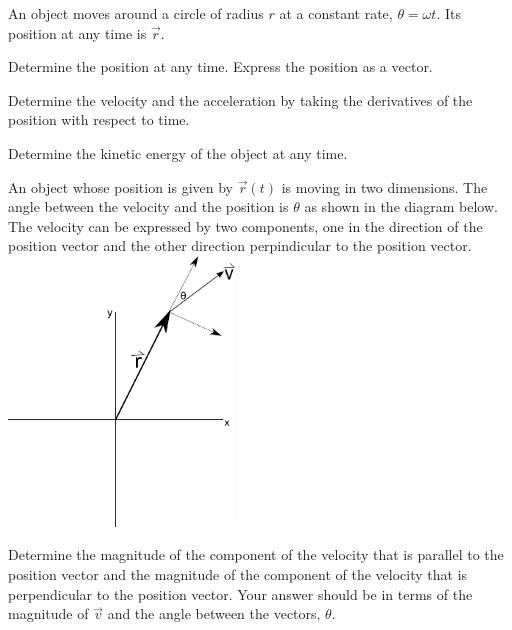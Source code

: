 \begin{problem}
\item An object moves around a circle of radius $r$  at a constant
  rate, $\theta=\omega t$. Its position at any time is $\vec{r}$.

  \begin{subproblem}
  \item Determine the position at any time. Express the position as
    a vector.
    \vfill
  \item Determine the velocity and the acceleration by taking the
    derivatives of the position with respect to time.
    \vfill
  \item Determine the kinetic energy of the object at any time.
    \vfill
  \end{subproblem}

  \clearpage

\item An object whose position is given by $\vec{r}(t)$ is moving in
  two dimensions. The angle between the velocity and the position is
  $\theta$ as shown in the diagram below. The velocity can be
  expressed by two components, one in the direction of the position
  vector and the other direction
  perpindicular to the position vector. \\
  \includegraphics[width=6cm]{ink/week12/angularComponents}

  \begin{subproblem}
  \item Determine the magnitude of the component of the velocity that
    is parallel to the position vector and the magnitude of the
    component of the velocity that is perpendicular to the position
    vector. Your answer should be in terms of the magnitude of
    $\vec{v}$ and the angle between the vectors, $\theta$.  


\end{subproblem}
\end{problem}
